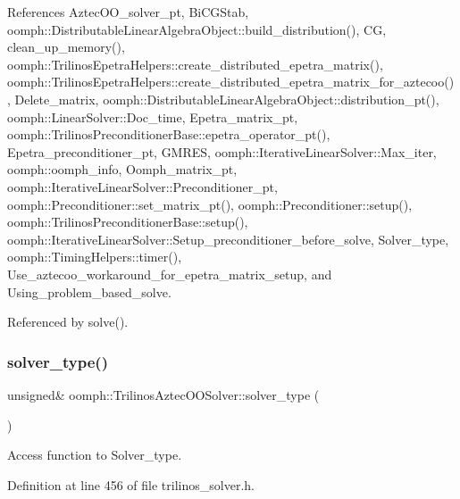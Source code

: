 References Aztec\+O\+O\+\_\+solver\+\_\+pt, Bi\+C\+G\+Stab, oomph\+::\+Distributable\+Linear\+Algebra\+Object\+::build\+\_\+distribution(), CG, clean\+\_\+up\+\_\+memory(), oomph\+::\+Trilinos\+Epetra\+Helpers\+::create\+\_\+distributed\+\_\+epetra\+\_\+matrix(), oomph\+::\+Trilinos\+Epetra\+Helpers\+::create\+\_\+distributed\+\_\+epetra\+\_\+matrix\+\_\+for\+\_\+aztecoo(), Delete\+\_\+matrix, oomph\+::\+Distributable\+Linear\+Algebra\+Object\+::distribution\+\_\+pt(), oomph\+::\+Linear\+Solver\+::\+Doc\+\_\+time, Epetra\+\_\+matrix\+\_\+pt, oomph\+::\+Trilinos\+Preconditioner\+Base\+::epetra\+\_\+operator\+\_\+pt(), Epetra\+\_\+preconditioner\+\_\+pt, G\+M\+R\+ES, oomph\+::\+Iterative\+Linear\+Solver\+::\+Max\+\_\+iter, oomph\+::oomph\+\_\+info, Oomph\+\_\+matrix\+\_\+pt, oomph\+::\+Iterative\+Linear\+Solver\+::\+Preconditioner\+\_\+pt, oomph\+::\+Preconditioner\+::set\+\_\+matrix\+\_\+pt(), oomph\+::\+Preconditioner\+::setup(), oomph\+::\+Trilinos\+Preconditioner\+Base\+::setup(), oomph\+::\+Iterative\+Linear\+Solver\+::\+Setup\+\_\+preconditioner\+\_\+before\+\_\+solve, Solver\+\_\+type, oomph\+::\+Timing\+Helpers\+::timer(), Use\+\_\+aztecoo\+\_\+workaround\+\_\+for\+\_\+epetra\+\_\+matrix\+\_\+setup, and Using\+\_\+problem\+\_\+based\+\_\+solve.



Referenced by solve().

\mbox{\label{classoomph_1_1TrilinosAztecOOSolver_a9169831da7460eec52071e8b3938bf97}} 
\subsubsection{\texorpdfstring{solver\+\_\+type()}{solver\_type()}}
{\footnotesize\ttfamily unsigned\& oomph\+::\+Trilinos\+Aztec\+O\+O\+Solver\+::solver\+\_\+type (\begin{DoxyParamCaption}{ }\end{DoxyParamCaption})\hspace{0.3cm}{\ttfamily [inline]}}



Access function to Solver\+\_\+type. 



Definition at line 456 of file trilinos\+\_\+solver.\+h.

